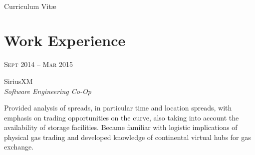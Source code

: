 \documentclass[10pt]{article}
\begin{document}
\color{text1} %




\par{\\ %
{\color{headings} Curriculum {Vit\ae}\\[15pt]\par}
	

\begin{minipage}[t]{0.5\textwidth} %
\vspace{0pt} %
	

\section{Work Experience} 


{\raggedleft\textsc{Sept 2014 -- Mar 2015}\par}

{\raggedright\large SiriusXM\\
\textit{Software Engineering Co-Op}\\[5pt]}

\normalsize{Provided analysis of spreads, in particular time and location spreads, with emphasis on trading opportunities on the curve, also taking into account the availability of storage facilities. Became familiar with logistic implications of physical gas trading and developed knowledge of continental virtual hubs for gas exchange.}\\



\end{minipage}}
\end{document}
